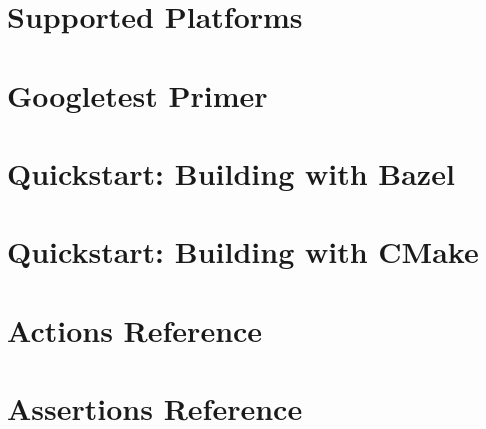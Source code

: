 \documentclass[twoside]{book}
\newcommand{\+}{\discretionary{\mbox{\scriptsize$\hookleftarrow$}}{}{}}
\begin{document}
\chapter{Supported Platforms}
\label{md___users_peterjanku__sources_cpp__kilobot_arena_external_googletest_docs_platforms}

\chapter{Googletest Primer}
\label{md___users_peterjanku__sources_cpp__kilobot_arena_external_googletest_docs_primer}

\chapter{Quickstart\+: Building with Bazel}
\label{md___users_peterjanku__sources_cpp__kilobot_arena_external_googletest_docs_quickstart_bazel}

\chapter{Quickstart\+: Building with CMake}
\label{md___users_peterjanku__sources_cpp__kilobot_arena_external_googletest_docs_quickstart_cmake}

\chapter{Actions Reference}
\label{md___users_peterjanku__sources_cpp__kilobot_arena_external_googletest_docs_reference_actions}

\chapter{Assertions Reference}
\label{md___users_peterjanku__sources_cpp__kilobot_arena_external_googletest_docs_reference_assertions}

\end{document}
